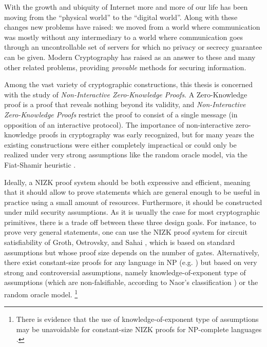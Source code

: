 With the growth and ubiquity of Internet more and more of our life has been moving from the ``physical world'' to the ``digital world''. Along with these changes new problems have raised: we moved from a world where communication was mostly without any intermediary to a world where communication goes through an uncontrollable set of servers for which no privacy or secrecy guarantee can be given. Modern Cryptography has raised as an answer to these and many other related problems, providing \emph{provable} methods for securing information.  

Among the vast variety of cryptographic constructions, this thesis is concerned with the study of \emph{Non-Interactive Zero-Knowledge Proofs}.
A Zero-Knowledge proof is a proof that reveals nothing beyond its validity, and \emph{Non-Interactive Zero-Knowledge Proofs} restrict the proof to consist of a single message (in opposition of an interactive protocol).
The importance of non-interactive zero-knowledge proofs in cryptography was early recognized, but for many years the existing constructions were either completely impractical or could only be realized under very strong assumptions like the random oracle model, via the Fiat-Shamir heuristic \cite{C:FiaSha86}. 

Ideally, a NIZK proof system should be both expressive and efficient, meaning that it should allow to prove
statements which are general enough to be useful in practice using a small amount of resources.
Furthermore, it should be constructed under
mild security assumptions.
As it is usually the case for most cryptographic primitives, there is a trade off between these three design goals.
For instance,
to prove very general statements, one can use the NIZK proof 
system for circuit satisfiability of Groth, Ostrovsky, and Sahai 
\cite{EC:GroOstSah06}, which is based on standard assumptions but 
whose proof size depends on the number of gates. 
Alternatively,
there exist constant-size proofs for any language in NP
  (e.g. \cite{EC:GGPR13}) but based on very strong and controversial assumptions, 
  namely knowledge-of-exponent type of assumptions 
  (which are non-falsifiable, according to Naor's classification 
  \cite{C:Naor03}) or the random oracle model. 
\footnote{There is evidence that the use of knowledge-of-exponent type of  assumptions 
may be unavoidable for constant-size NIZK proofs for NP-complete languages \cite{STOC:GenWic11}.}

